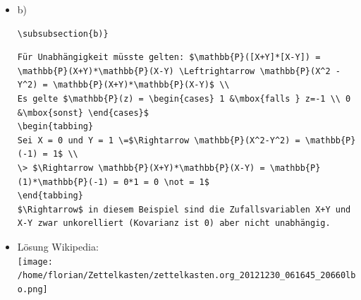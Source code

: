 \documentclass[11pt]{article}
\begin{document}
\begin{itemize}
=> Cov(X+Y, X-Y) = E[ (X+Y) * (X-Y) ] - E(X+Y)E(X-Y)
                    = E[ X$^2$ - Y$^2$ ] - E(X+Y)E(X-Y)

                 = E[ ([X+Y]-E[X+Y]) * ([X-Y] - E[X-Y])  ]
                    = E[  [X+Y][X-Y] - [X+Y]E[X-Y] - E[X+Y][X-Y] + E[X+Y]E[X-Y]   ]
       = E[  X$^2$ - Y$^2$ - (E[X-Y]X + E[X-Y]Y) - (E[X+Y]X - E[X+Y]Y) + E[X+Y]E[X-Y]  ]
       = E[  X$^2$ - Y$^2$ - E[X-Y]X - E[X-Y]Y - E[X+Y]X + E[X+Y]Y + E[X+Y]E[X-Y]  ]

=> Cov(X+Y, X-Y) = Cov(X,X-Y) + Cov(Y,X-Y) = Cov(X-Y,X) + Cov(X-Y, Y) = Cov(X,X) - Cov(Y,X) + Cov(X,Y) - Cov(Y,Y) = Cov(X,X) - Cov(Y,Y)
= Var(X) - Var(Y) = 0 (da gleichverteilt)

\begin{verbatim}
Da X und Y gleichverteilt sind, gilt: $Var(X) = Var(Y) \rightarrow Var(X) - Var(Y) = 0$\\
Durch die symmetrie der Kovarianz lässt sich umformen:\\
$Cov(X+Y, X-Y) = Cov(X,X-Y) + Cov(Y,X-Y) = Cov(X-Y,X) + Cov(X-Y, Y) = Cov(X,X) - Cov(Y,X) + Cov(X,Y) - Cov(Y,Y)$\\
$ = Cov(X,X) - Cov(Y,Y) = Var(X) - Var(Y) = 0$
\end{verbatim}


\item b)\\
\label{sec-3-8-4-2}%
\begin{verbatim}
\subsubsection{b)}
\end{verbatim}


\begin{verbatim}
Für Unabhängigkeit müsste gelten: $\mathbb{P}([X+Y]*[X-Y]) = \mathbb{P}(X+Y)*\mathbb{P}(X-Y) \Leftrightarrow \mathbb{P}(X^2 - Y^2) = \mathbb{P}(X+Y)*\mathbb{P}(X-Y)$ \\
Es gelte $\mathbb{P}(z) = \begin{cases} 1 &\mbox{falls } z=-1 \\ 0 &\mbox{sonst} \end{cases}$
\begin{tabbing}
Sei X = 0 und Y = 1 \=$\Rightarrow \mathbb{P}(X^2-Y^2) = \mathbb{P}(-1) = 1$ \\
\> $\Rightarrow \mathbb{P}(X+Y)*\mathbb{P}(X-Y) = \mathbb{P}(1)*\mathbb{P}(-1) = 0*1 = 0 \not = 1$ 
\end{tabbing}
$\Rightarrow$ in diesem Beispiel sind die Zufallsvariablen X+Y und X-Y zwar unkorelliert (Kovarianz ist 0) aber nicht unabhängig.
\end{verbatim}


\item Lösung Wikipedia:\\
\label{sec-3-8-4-3}%
\texttt{[image: /home/florian/Zettelkasten/zettelkasten.org\_20121230\_061645\_20660lbo.png]}

\end{itemize} %
\end{document}
